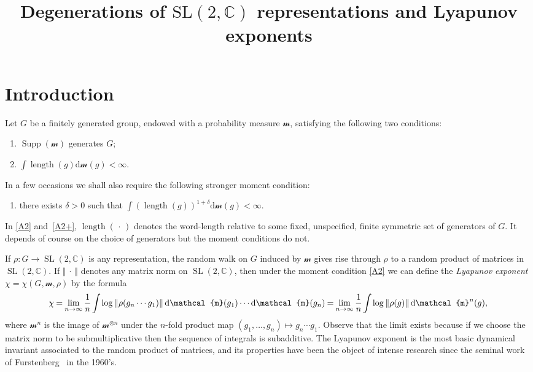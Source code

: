 \documentclass[AHL,Unicode,longabstracts]{cedram}
\title[Degenerations of $\mathrm{SL}(2, \mathbb{C})$ representations and Lyapunov exponents]{Degenerations of $\mathrm{SL}(2, \mathbb{C})$ representations and Lyapunov exponents}
\author[\initial{R.} \lastname{Dujardin}]{\firstname{Romain} \lastname{Dujardin}}
\author[\initial{C.} \lastname{Favre}]{\firstname{Charles} \lastname{Favre}}
\DeclareMathOperator{\supp}{Supp}
\DeclareMathOperator{\length}{length}
\DeclareMathOperator{\SL}{SL}
\newcommand{\sm}{\mathcal{m}}
\newcommand{\norm}[1]{\left\Vert#1\right\Vert}
\newcommand{\unsur}[1]{\frac{1}{#1}}
\newcommand{\SLC}{\SL(2,\mathbb C)}
\newcommand*{\dd}{\mathrm{d}}
\newcommand*{\dsm}{\dd \sm}
\newcommand*{\mk}{\mkern -1mu}
\begin{document}
\maketitle

\section*{Introduction}

Let $G$ be a finitely generated group, endowed with a probability measure $\sm$, satisfying the following two conditions:
\begin{enumerate}\renewcommand{\theenumi}{A\arabic{enumi}}
\item \label{A1} $\supp(\sm)$ generates $G$;
\item \label{A2} $ \int \length(g) \dsm(g)<\infty$.
\end{enumerate}
In a few occasions we shall also require the following stronger moment condition:
\begin{enumerate}\renewcommand{\theenumi}{A\arabic{enumi}${}^+$}\setcounter{enumi}{1}
\item \label{A2+} there exists $\delta >0$ such that $ \int (\length(g))^{1+\delta} \dsm(g)<\infty$.
\end{enumerate}
In \eqref{A2} and~\eqref{A2+}, $\length({\,\cdot\,})$ denotes the word-length relative to some fixed, unspecified, finite symmetric set of generators of $G$. It depends of course on the choice of generators but the moment conditions do not.


If $\rho:G \to \SLC$ is any representation, the random walk on $G$ induced by $\sm$ gives rise through $\rho$ to a random product of matrices in $\SLC$. If $\norm{{\,\cdot\,}}$ denotes any matrix norm on $\SLC$, then under the moment condition \eqref{A2} we can define the \emph{Lyapunov exponent} $\chi = \chi(G, \sm, \rho)$ by the formula
\begin{equation}
\label{def:lyapunov exponent intro}
\!\chi \mk=\mk \lim_{n\to\infty} \unsur{n} \mk\int\mk \log\norm{\rho(g_n\cdots g_1)} \dsm(g_1) \cdots \dsm(g_n) \mk=\mk \lim_{n\to\infty} \unsur{n} \mk\int\mk \log\norm{\rho(g)} \dsm^n(g),
\end{equation}
where $\sm^n$ is the image of $\sm^{\otimes n}$ under the $n$-fold product map $(g_1, \ldots, g_n)\mapsto g_n\cdots g_1$. Observe that the limit exists because if we choose the matrix norm to be submultiplicative then the sequence of integrals is subadditive. The Lyapunov exponent is the most basic dynamical invariant associated to the random product of matrices, and its properties have been the object of intense research since the seminal work of Furstenberg~\cite{furstenberg} in the 1960's.
\end{document}
